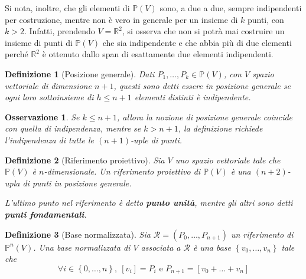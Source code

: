 \documentclass[12pt]{scrartcl}
\theoremstyle{style}
\newtheorem{definizione}{Definizione}[section]
\newtheorem{osservazione}{Osservazione}[section]
\numberwithin{equation}{subsection}
\renewcommand{\textbf}[1]{\textsf{\bfseries #1}}
\begin{document}
Si nota, inoltre, che gli elementi di $\mathbb{P}(V)$ sono, a due a due, sempre indipendenti per costruzione, mentre non \`e vero in generale per un insieme di $k$ punti, con $k>2$.
Infatti, prendendo $V = \mathbb{R}^2$, si osserva che non si potr\`a mai costruire un insieme di punti di $\mathbb{P}(V)$ che sia indipendente e che abbia pi\`u di due elementi perch\'e $\mathbb{R}^2$ \`e ottenuto dallo span di esattamente due elementi indipendenti.
\begin{definizione}
	[Posizione generale]
	Dati $P_1,\ldots,P_k \in \mathbb{P}(V)$, con $V$ spazio vettoriale di dimensione $n+1$, questi sono detti essere in \textit{posizione generale} se ogni loro sottoinsieme di $h\le n+1$ elementi distinti \`e indipendente.
\end{definizione}
\begin{osservazione}
Se $k\le n+1$, allora la nozione di posizione generale coincide con quella di indipendenza, mentre se $k>n+1$, la definizione richiede l'indipendenza di tutte le $(n+1)$-uple di punti.
\end{osservazione}
\begin{definizione}
	[Riferimento proiettivo]
	Sia $V$ uno spazio vettoriale tale che $\mathbb{P}(V)$ \`e $n$-dimensionale.
	Un \textit{riferimento proiettivo} di $\mathbb{P}(V)$ \`e una $(n+2)$-upla di punti in posizione generale.

	L'ultimo punto nel riferimento \`e detto \textbf{punto unit\`a}, mentre gli altri sono detti \textbf{punti fondamentali}.
\end{definizione}
\begin{definizione}
	[Base normalizzata]
	Sia $\mathcal{R} =(P_0,\ldots,P_{n+1} )$ un riferimento di $\mathbb{P}^n(V)$.
	Una \textit{base normalizzata} di $V$ associata a $\mathcal{R} $ \`e una base $\left\{ v_0,\ldots,v_n \right\} $ tale che
	\[
		\forall i \in \left\{ 0,\ldots,n \right\} , \ [v_i] = P_i \text{ e } P_{n+1} = [v_0+\ldots+v_n]
	\] 
\end{definizione}
\end{document}
